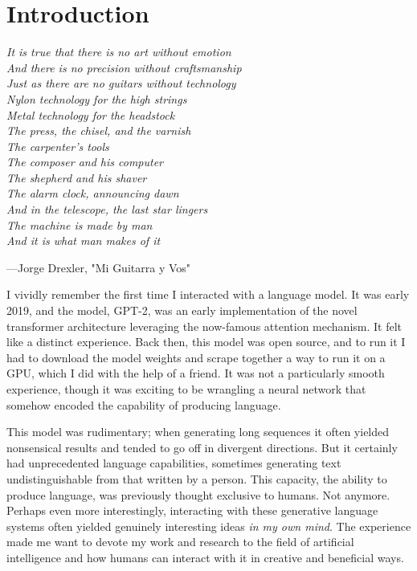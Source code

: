 \chapter[Introduction]{Introduction}


\begin{flushleft}
\begin{minipage}[t]{0.80\textwidth}
\textit{It is true that there is no art without emotion\\
And there is no precision without craftsmanship\\
Just as there are no guitars without technology\\
Nylon technology for the high strings\\
Metal technology for the headstock\\
The press, the chisel, and the varnish\\
The carpenter's tools\\
The composer and his computer\\
The shepherd and his shaver\\
The alarm clock, announcing dawn\\
And in the telescope, the last star lingers\\
The machine is made by man\\
And it is what man makes of it}
\end{minipage}

\medskip
\hfill---Jorge Drexler, "Mi Guitarra y Vos"
\end{flushleft}

\bigskip

I vividly remember the first time I interacted with a language model. It was early 2019, and the model, GPT-2, was an early implementation of the novel transformer architecture leveraging the now-famous attention mechanism. It felt like a distinct experience. Back then, this model was open source, and to run it I had to download the model weights and scrape together a way to run it on a GPU, which I did with the help of a friend. It was not a particularly smooth experience, though it was exciting to be wrangling a neural network that somehow encoded the capability of producing language.

This model was rudimentary; when generating long sequences it often yielded nonsensical results and tended to go off in divergent directions. But it certainly had unprecedented language capabilities, sometimes generating text undistinguishable from that written by a person. This capacity, the ability to produce language, was previously thought exclusive to humans. Not anymore. Perhaps even more interestingly, interacting with these generative language systems often yielded genuinely interesting ideas \textit{in my own mind}.  The experience made me want to devote my work and research to the field of artificial intelligence and how humans can interact with it in creative and beneficial ways.

